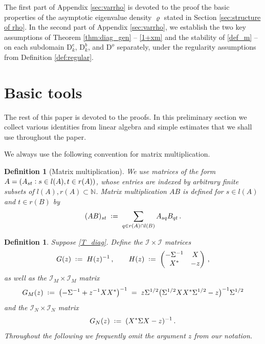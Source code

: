 \documentclass[11pt]{article} %
\numberwithin{equation}{section}
\numberwithin{figure}{section}
\theoremstyle{plain} %
\newtheorem{definition}[theorem]{Definition}
\theoremstyle{definition} %
\newcommand{\f}[1]{\boldsymbol{\mathrm{#1}}} %
\renewcommand{\cal}{\mathcal}
\newcommand{\N}{\mathbb{N}}
\newcommand{\col}{\mathrel{\vcenter{\baselineskip0.75ex \lineskiplimit0pt \hbox{.}\hbox{.}}}}
\newcommand*{\deq}{\mathrel{\vcenter{\baselineskip0.65ex \lineskiplimit0pt \hbox{.}\hbox{.}}}=}
\newcommand{\pb}[1]{\bigl({#1}\bigr)}
\begin{document}
The first part of Appendix \ref{sec:varrho} is devoted to the proof the basic properties of the asymptotic eigenvalue density $\varrho$ stated in Section \ref{sec:structure of rho}. In the second part of Appendix \ref{sec:varrho}, we establish the two key assumptions of Theorem \ref{thm:diag_gen} -- \eqref{1+xm} and the stability of \eqref{def_m} -- on each subdomain $\f D^e_k$, $\f D^b_k$, and $\f D^o$ separately, under the regularity assumptions from Definition \ref{def:regular}.


\section{Basic tools} \label{sec:tools}

The rest of this paper is devoted to the proofs. In this preliminary section we collect various identities from linear algebra and simple estimates that we shall use throughout the paper.

We always use the following convention for matrix multiplication.

\begin{definition}[Matrix multiplication] \label{def:matrix_m}
We use matrices of the form $A = (A_{st} \col s \in l(A), t \in r(A))$, whose entries are indexed by arbitrary finite subsets of $l(A), r(A) \subset \N$. Matrix multiplication $A B$ is defined for $s \in l(A)$ and $t \in r(B)$ by
\begin{equation*}
(A B)_{st} \;\deq\; \sum_{q \in r(A) \cap l(B)} A_{sq} B_{qt}\,.
\end{equation*}
\end{definition}

\begin{definition}
Suppose \eqref{T_diag}.
Define the $\cal I \times \cal I$ matrices
\begin{equation*}
G(z) \;\deq\; H(z)^{-1}\,, \qquad H(z) \;\deq\; \begin{pmatrix}
-\Sigma^{-1} & X
\\
X^* & -z
\end{pmatrix}\,,
\end{equation*}
as well as the 
$\cal I_M \times \cal I_M$ matrix
\begin{equation} \label{defGM}
G_M(z) \;\deq\; \pb{-\Sigma^{-1}+z^{-1} XX^*}^{-1} \;=\; z \Sigma^{1/2} \pb{\Sigma^{1/2}XX^*\Sigma^{1/2}-z}^{-1}\Sigma^{1/2}
\end{equation}
and the $\cal I_N \times \cal I_N$ matrix
\begin{equation} \label{defGN}
G_N(z) \;\deq\; ( X^*\Sigma X - z)^{-1}\,.
\end{equation}
Throughout the following we frequently omit the argument $z$ from our notation.
\end{definition}
\end{document}
